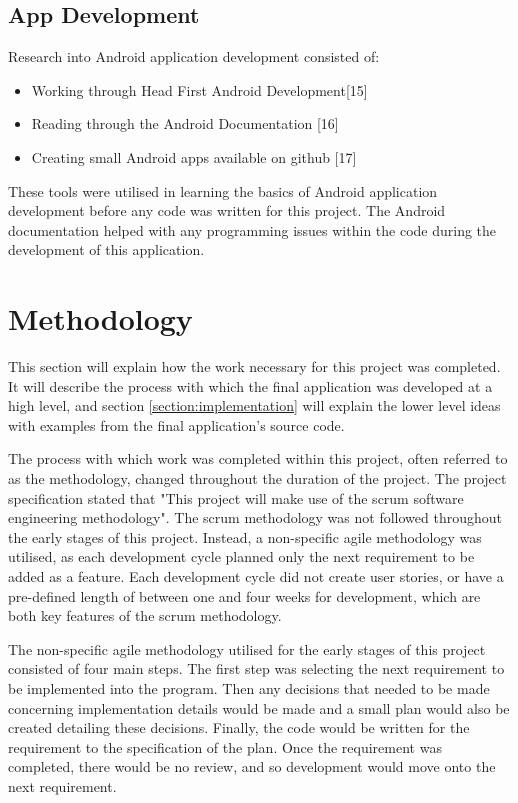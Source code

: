 \documentclass{article}
\begin{document}
\subsection{App Development}

Research into Android application development consisted of: 

\begin{itemize}
	\item Working through Head First Android Development[15]
	\item Reading through the Android Documentation [16]
	\item Creating small Android apps available on github [17]
\end{itemize}

These tools were utilised in learning the basics of Android application development before any code was written for this project. The Android documentation helped with any programming issues within the code during the development of this application. 

\section{Methodology}
\label{section:methodology}

This section will explain how the work necessary for this project was completed. It will describe the process with which the final application was developed at a high level, and section \ref{section:implementation} will explain the lower level ideas with examples from the final application's source code. \par

The process with which work was completed within this project, often referred to as the methodology, changed throughout the duration of the project. The project specification stated that "This project will make use of the scrum software engineering methodology". The scrum methodology was not followed throughout the early stages of this project. Instead, a non-specific agile methodology was utilised, as each development cycle planned only the next requirement to be added as a feature. Each development cycle did not create user stories, or have a pre-defined length of between one and four weeks for development, which are both key features of the scrum methodology. \par

The non-specific agile methodology utilised for the early stages of this project consisted of four main steps. The first step was selecting the next requirement to be implemented into the program. Then any decisions that needed to be made concerning implementation details would be made and a small plan would also be created detailing these decisions. Finally, the code would be written for the requirement to the specification of the plan. Once the requirement was completed, there would be no review, and so development would move onto the next requirement. \par
\end{document}
